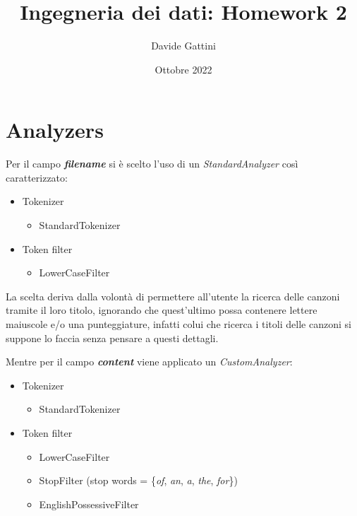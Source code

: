 \documentclass{article}
\title{Ingegneria dei dati: Homework 2}
\author{Davide Gattini}
\date{Ottobre 2022}
\begin{document}
\maketitle

\section{Analyzers}
Per il campo \textbf{\textit{filename}} si è scelto l'uso di un \textit{StandardAnalyzer} così caratterizzato:
\begin{itemize}
	\item Tokenizer
	\begin{itemize}
		\item StandardTokenizer
	\end{itemize}
	\item Token filter
	\begin{itemize}
		\item LowerCaseFilter
	\end{itemize}
\end{itemize}

La scelta deriva dalla volontà di permettere all'utente la ricerca delle canzoni tramite il loro titolo, ignorando che quest'ultimo possa contenere lettere maiuscole e/o una punteggiature, infatti colui che ricerca i titoli delle canzoni si suppone lo faccia senza pensare a questi dettagli. 
\iffalse
e qualora non si facessero queste considerazioni, i documenti cui titoli hanno punteggiatura o maiuscole, non verranno trovati dal programma a meno che l'utente non sappia dove esse si trovano. 
\fi

Mentre per il campo \textbf{\textit{content}} viene applicato un \textit{CustomAnalyzer}:
\begin{itemize}
	\item Tokenizer
	\begin{itemize}
		\item StandardTokenizer
	\end{itemize}
	\item Token filter
	\begin{itemize}
		\item LowerCaseFilter
		\item StopFilter (stop words = \{\textit{of}, \textit{an}, \textit{a}, \textit{the}, \textit{for}\})
        \item EnglishPossessiveFilter
	\end{itemize}
\end{itemize}
\end{document}
